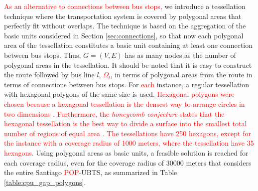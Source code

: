 \documentclass[preprint,11pt]{elsarticle}
\begin{document}
\textcolor{red}{As an alternative to connections between bus stops,} we introduce a tessellation technique where the transportation system is covered by polygonal areas that perfectly fit without overlaps.
The technique is based on the aggregation of the basic units considered in Section \ref{sec:connections}, so that now each polygonal area of the tessellation constitutes a basic unit containing at least one connection between bus stops.
Thus, $G = (V, E)$ has as many nodes as the number of polygonal areas in the tessellation.
It should be noted that it is easy to construct the route followed by bus line $l$, \textcolor{red}{$\Omega_{l}$}, in terms of polygonal areas from the route in terms of connections between bus stops. 
For \textcolor{red}{each} instance, a regular tessellation with hexagonal polygons of the same size is used.
\textcolor{red}{Hexagonal polygons were chosen because a hexagonal tessellation is the densest way to arrange circles in two dimensions \citep{Sandoval2022}.
Furthermore, the \textit{honeycomb conjecture} states that the hexagonal tessellation is the best way to divide a surface into the smallest total number of regions of equal area \citep{Hales2001}.}
\textcolor{red}{The tessellations have 250 hexagons, except for the instance with a coverage radius of 1000 meters, where the tessellation have 35 hexagons.}
Using polygonal areas as basic units, a feasible solution is reached for each coverage radius, even for the coverage radius of 30000 meters that considers the entire Santiago \textcolor{red}{POP-}UBTS, as summarized in Table \ref{table:cpu_gap_polygons}.

\begin{table}[h]
\centering
\caption{\textcolor{red}{Scalability using polygonal areas}}
\label{table:cpu_gap_polygons}
\end{table}
\end{document}
